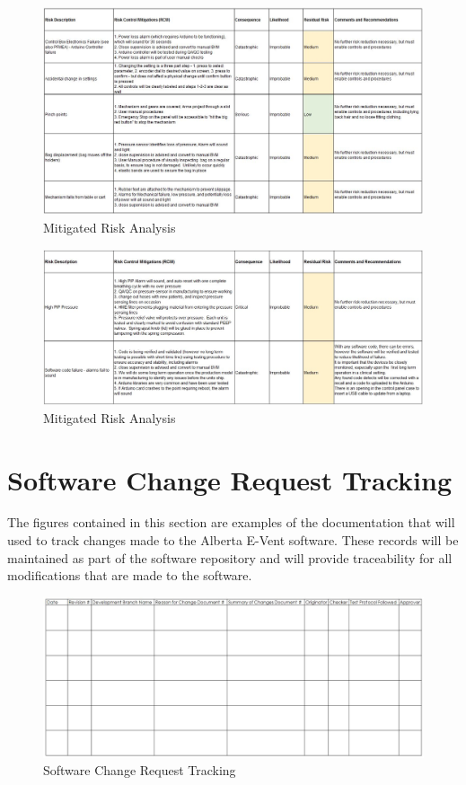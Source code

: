 \documentclass[]{article}
\begin{document}
\begin{appendices}
\begin{figure}
	\includegraphics[scale= 0.7]{figures/mit3.jpg}
	\caption{Mitigated Risk Analysis}
	\label{fig:mit3}
\end{figure}

\begin{figure}
	\includegraphics[scale= 0.6]{figures/mit4.jpg}
	\caption{Mitigated Risk Analysis}
	\label{fig:mit4}
\end{figure}


\clearpage
\section{Software Change Request Tracking}
\label{app:change}
The figures contained in this section are examples of the documentation that will used to track changes made to the Alberta E-Vent software.  These records will be maintained as part of the software repository and will provide traceability for all modifications that are made to the software.

\begin{figure}
	\includegraphics[scale= 0.6]{figures/change.jpg}
	\caption{Software Change Request Tracking}
	\label{fig:change_tracking}
\end{figure}

\end{appendices}
\end{document}
